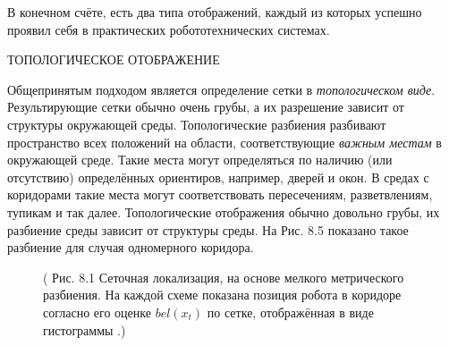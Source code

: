 \documentclass[10pt,a4paper]{article}
\begin{document}
В конечном счёте, есть два типа отображений, каждый из которых успешно проявил себя в практических робототехнических системах.

ТОПОЛОГИЧЕСКОЕ ОТОБРАЖЕНИЕ

Общепринятым подходом является определение сетки в \textit{топологическом виде}.  Результирующие сетки обычно очень грубы, а их разрешение зависит от структуры окружающей среды. Топологические разбиения разбивают пространство всех положений на области, соответствующие \textit{важным местам} в окружающей среде. Такие места могут определяться по наличию (или отсутствию) определённых ориентиров, например, дверей и окон. В средах с коридорами такие места могут соответствовать пересечениям, разветвлениям, тупикам и так далее. Топологические отображения обычно довольно грубы, их разбиение среды зависит от структуры среды. На Рис. 8.5 показано такое разбиение для случая одномерного коридора. 

\begin{figure}[H]
	\caption{ (  Рис. 8.1 Сеточная локализация, на основе мелкого метрического разбиения. На каждой схеме показана позиция робота в коридоре согласно его оценке $bel(x_t)$ по сетке, отображённая в виде гистограммы .)}
	\label{fig:81orig}
\end{figure}
\end{document}
